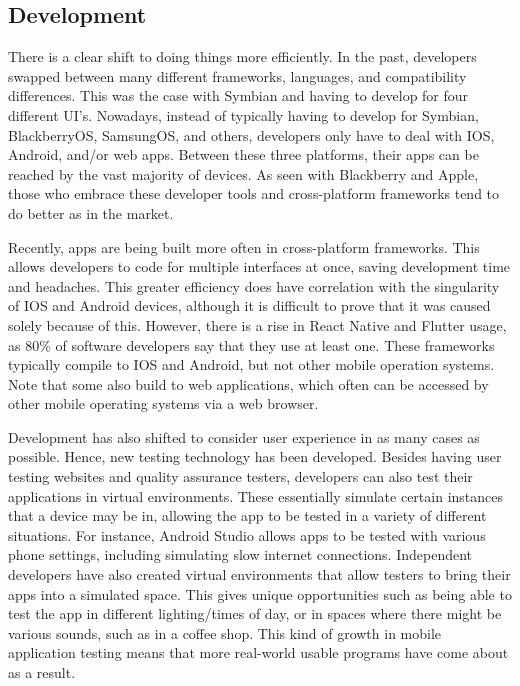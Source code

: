 \documentclass{article}
\begin{document}
\subsection{Development}
\tab There is a clear shift to doing things more efficiently. In the past, developers swapped between many different frameworks, languages, and compatibility differences. This was the case with Symbian and having to develop for four different UI's. Nowadays, instead of typically having to develop for Symbian, BlackberryOS, SamsungOS, and others, developers only have to deal with IOS, Android, and/or web apps. Between these three platforms, their apps can be reached by the vast majority of devices. As seen with Blackberry and Apple, those who embrace these developer tools and cross-platform frameworks tend to do better as in the market.

Recently, apps are being built more often in cross-platform frameworks. This allows developers to code for multiple interfaces at once, saving development time and headaches. This greater efficiency does have correlation with the singularity of IOS and Android devices, although it is difficult to prove that it was caused solely because of this. However, there is a rise in React Native and Flutter usage, as 80\% of software developers say that they use at least one.\cite{vailshery_2022} These frameworks typically compile to IOS and Android, but not other mobile operation systems. Note that some also build to web applications, which often can be accessed by other mobile operating systems via a web browser. 

Development has also shifted to consider user experience in as many cases as possible. Hence, new testing technology has been developed. Besides having user testing websites and quality assurance testers, developers can also test their applications in virtual environments. These essentially simulate certain instances that a device may be in, allowing the app to be tested in a variety of different situations. For instance, Android Studio allows apps to be tested with various phone settings, including simulating slow internet connections. Independent developers have also created virtual environments that allow testers to bring their apps into a simulated space.\cite{vrtestbed} This gives unique opportunities such as being able to test the app in different lighting/times of day, or in spaces where there might be various sounds, such as in a coffee shop. This kind of growth in mobile application testing means that more real-world usable programs have come about as a result.
\end{document}
